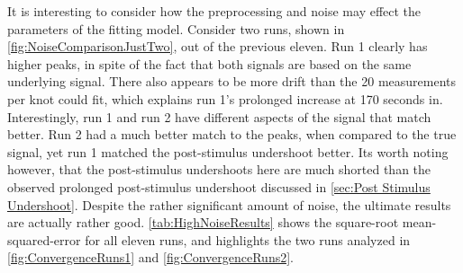 It is interesting to consider how the preprocessing and noise may effect the
parameters of the fitting model. Consider two runs, shown in 
\autoref{fig:NoiseComparisonJustTwo}, out of the previous eleven. 
Run 1 clearly has higher peaks, in spite of the fact that both signals are based
on the same underlying signal. There also appears
to be more drift than the 20 measurements per knot could fit, which explains run 1's
prolonged increase at 170 seconds in. Interestingly, run 1 and run 2 have different
aspects of the signal that match better. Run 2 had a much better match to the 
peaks, when compared to the true signal, yet run 1 matched the post-stimulus
undershoot better. Its worth noting however, that the post-stimulus undershoots
here are much shorted than the observed prolonged post-stimulus undershoot
discussed in \autoref{sec:Post Stimulus Undershoot}. 
Despite the rather significant amount of noise, the ultimate results are 
actually rather good. \autoref{tab:HighNoiseResults} shows
the square-root mean-squared-error for all eleven runs, and highlights the two runs analyzed 
in \autoref{fig:ConvergenceRuns1} and \autoref{fig:ConvergenceRuns2}.

